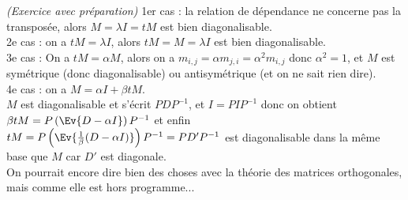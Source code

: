 \documentclass[11pt]{article}%
\begin{document}
\begin{exercice}{\it (Exercice avec préparation)}
 1er cas : la relation de dépendance ne concerne pas la transposée,
alors $M = \lambda I = {}{t} M$ est bien diagonalisable. \\
 2e cas : on a ${}{t} M = \lambda I$, alors ${}{t} M = M = \lambda I$
est bien diagonalisable. \\
 3e cas : On a ${}{t} M = \alpha M$, alors on a $m_{i,j} = \alpha
m_{j,i} = \alpha^{2} m_{i,j}$ donc $\alpha^{2} = 1$, et $M$ est
symétrique (donc diagonalisable) ou antisymétrique (et on ne sait rien
dire). \\
 4e cas : on a $M = \alpha I + \beta {}{t} M$. \\
 $M$ est diagonalisable et s'écrit $P D P^{-1}$, et $I = P I P^{-1}$
donc on obtient $\beta {}{t} M = P \left(\Ev{ D - \alpha I}\right)
P^{-1}$ et enfin ${}{t} M = P \left(\Ev{ \frac{1}{\beta} ( D - \alpha
I)}\right) P^{-1} = P D' P^{-1}$ est diagonalisable dans la même base
que $M$ car $D'$ est diagonale. \\
 On pourrait encore dire bien des choses avec la théorie des matrices
orthogonales, mais comme elle est hors programme...
 \end{exercice}

 \newpage
\end{document}
